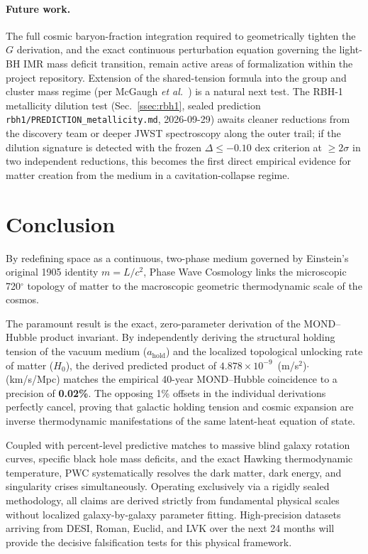 \documentclass[aps,prd,twocolumn,superscriptaddress,amsmath,amssymb,nofootinbib,floatfix]{revtex4-2}
\newcommand{\amax}{a_{\text{hold}}}
\begin{document}
\paragraph*{Future work.}
The full cosmic baryon-fraction integration required to geometrically tighten the $G$ derivation, and the exact continuous perturbation equation governing the light-BH IMR mass deficit transition, remain active areas of formalization within the project repository. Extension of the shared-tension formula into the group and cluster mass regime (per McGaugh \emph{et al.}~\cite{McGaugh2026}) is a natural next test. The RBH-1 metallicity dilution test (Sec.~\ref{ssec:rbh1}, sealed prediction \texttt{rbh1/PREDICTION\_metallicity.md}, 2026-09-29) awaits cleaner reductions from the discovery team or deeper JWST spectroscopy along the outer trail; if the dilution signature is detected with the frozen $\Delta \leq -0.10$ dex criterion at $\geq 2\sigma$ in two independent reductions, this becomes the first direct empirical evidence for matter creation from the medium in a cavitation-collapse regime.

\section{Conclusion}
\label{sec:conclusion}

By redefining space as a continuous, two-phase medium governed by Einstein's original 1905 identity $m = L/c^2$, Phase Wave Cosmology links the microscopic 720$^{\circ}$ topology of matter to the macroscopic geometric thermodynamic scale of the cosmos.

The paramount result is the exact, zero-parameter derivation of the MOND--Hubble product invariant. By independently deriving the structural holding tension of the vacuum medium ($\amax$) and the localized topological unlocking rate of matter ($H_0$), the derived predicted product of $4.878 \times 10^{-9}$~(m/s$^2$)$\cdot$(km/s/Mpc) matches the empirical 40-year MOND--Hubble coincidence to a precision of \textbf{0.02\%}. The opposing 1\% offsets in the individual derivations perfectly cancel, proving that galactic holding tension and cosmic expansion are inverse thermodynamic manifestations of the same latent-heat equation of state.

Coupled with percent-level predictive matches to massive blind galaxy rotation curves, specific black hole mass deficits, and the exact Hawking thermodynamic temperature, PWC systematically resolves the dark matter, dark energy, and singularity crises simultaneously. Operating exclusively via a rigidly sealed methodology, all claims are derived strictly from fundamental physical scales without localized galaxy-by-galaxy parameter fitting. High-precision datasets arriving from DESI, Roman, Euclid, and LVK over the next 24 months will provide the decisive falsification tests for this physical framework.
\end{document}
